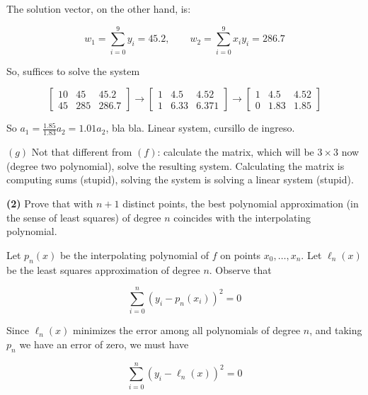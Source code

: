 \documentclass[12pt]{article}
\theoremstyle{definition}
\begin{document}
The solution vector, on the other hand, is: 

\begin{equation*}
    w_{1} = \sum_{i=0}^9 y_i = 45.2, \qquad w_2 = \sum_{i=0}^9 x_i y_i = 286.7
\end{equation*}

So, suffices to solve the system 

\begin{equation*}
    \begin{bmatrix} 
    10 & 45 & 45.2 \\ 
    45 & 285 & 286.7
    \end{bmatrix} \to \begin{bmatrix} 
    1 & 4.5 & 4.52 \\ 
    1 & 6.33 & 6.371 
    \end{bmatrix} \to \begin{bmatrix} 
    1 & 4.5 & 4.52\\
    0 & 1.83 & 1.85 
    \end{bmatrix} 
\end{equation*}

So $a_1 = \frac{1.85}{1.83} a_2 = 1.01 a_2$, bla bla. Linear system, cursillo de
ingreso.

$(g)$ Not that different from $(f)$: calculate the matrix, which will be
$3\times 3$ now (degree two polynomial), solve the resulting system.
Calculating the matrix is computing sums (stupid), solving the system is solving
a linear system (stupid).

\pagebreak 

\begin{shaded}
    \textbf{(2)} Prove  that with $n + 1$ distinct points, the best polynomial
    approximation (in the sense of least squares) of degree $n$ coincides with
    the interpolating polynomial.
\end{shaded}

Let $p_n(x)$ be the interpolating polynomial of $f$ on points $x_0, \ldots,
x_n$. Let $\ell_n(x)$ be the least squares approximation of degree $n$.
Observe that 

\begin{equation*}
    \sum_{i=0}^n (y_i - p_n(x_i))^2 = 0
\end{equation*}

Since $\ell_n(x)$ minimizes the error among all polynomials of degree $n$,
and taking $p_n$ we have an error of zero, we must have 

\begin{equation*}
    \sum_{i=0}^n (y_i - \ell_n(x))^2 = 0 
\end{equation*}
\end{document}
